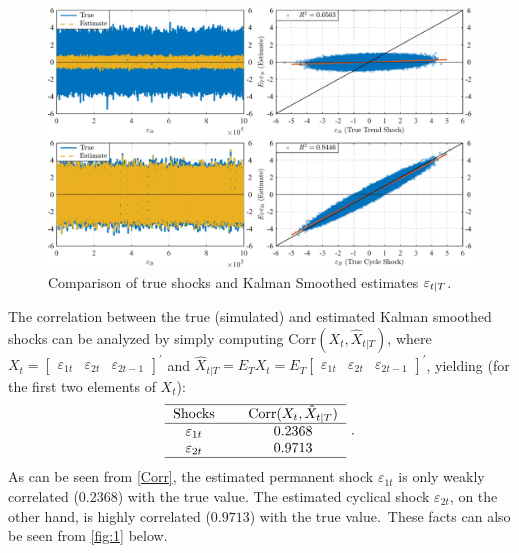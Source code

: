 \documentclass[a4paper,final,12pt]{article}
\begin{document}
\begin{figure}[h!]
\centering
\includegraphics[width=1\textwidth,trim={0 0 0
0},clip,angle=00]{HP97_plots_KS.pdf}
\caption{Comparison of true shocks and Kalman Smoothed estimates $\protect%
\varepsilon _{t|T}$.}
\label{fig:1}
\end{figure}
The correlation between the true (simulated) and estimated Kalman smoothed
shocks can be analyzed by simply computing $\mathrm{Corr}(X_{t},\hat{X}%
_{t|T})$, where $X_{t}=%
\begin{bmatrix}
\varepsilon _{1t} & \varepsilon _{2t} & \varepsilon _{2t-1}%
\end{bmatrix}%
^{\prime }$ and $\hat{X}_{t|T}=E_{T}X_{t}=E_{T}%
\begin{bmatrix}
\varepsilon _{1t} & \varepsilon _{2t} & \varepsilon _{2t-1}%
\end{bmatrix}%
^{\prime }$, yielding (for the first two elements of $X_{t}$):%
\begin{equation}
\begin{tabular}{ccc}
\hline
Shocks &  & $\mathrm{Corr}(X_{t},\hat{X}_{t|T})$ \\ \hline
$\varepsilon _{1t}$ &  & $0.2368$ \\ 
$\varepsilon _{2t}$ &  & $0.9713$ \\ \hline
\end{tabular}%
~.  \label{Corr}
\end{equation}%
As can be seen from \ref{Corr}, the estimated permanent shock $\varepsilon
_{1t}$ is only weakly correlated ($0.2368$) with the true value. The
estimated cyclical shock $\varepsilon _{2t}$, on the other hand, is highly
correlated ($0.9713$) with the true value.\ These facts can also be seen
from \autoref{fig:1} below.
\end{document}
